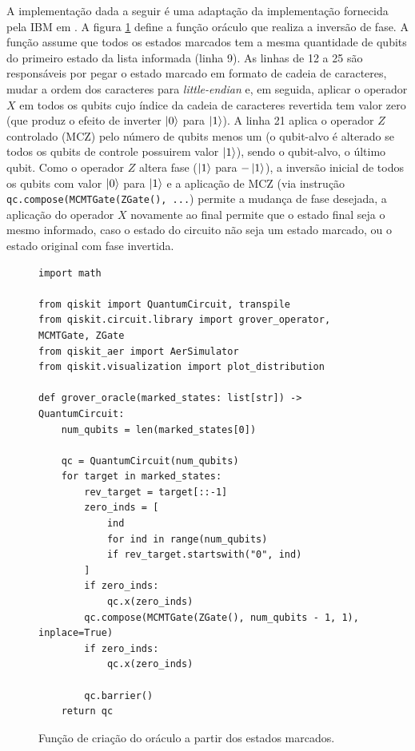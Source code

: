 A implementação dada a seguir é uma adaptação da implementação fornecida pela IBM em \cite{ibm_grover_tutorial}. A figura \ref{fig:qoracle} define a função oráculo que realiza a inversão de fase. A função assume que todos os estados marcados tem a mesma quantidade de qubits do primeiro estado da lista informada (linha 9). As linhas de 12 a 25 são responsáveis por pegar o estado marcado em formato de cadeia de caracteres, mudar a ordem dos caracteres para \textit{little-endian} e, em seguida, aplicar o operador $X$ em todos os qubits cujo índice da cadeia de caracteres revertida tem valor zero (que produz o efeito de inverter $\ket{0}$ para $\ket{1}$). A linha 21 aplica o operador $Z$ controlado (\textsf{MCZ}) pelo número de qubits menos um (o qubit-alvo é alterado se todos os qubits de controle possuirem valor $\ket{1}$), sendo o qubit-alvo, o último qubit. Como o operador $Z$ altera fase ($\ket{1}$ para $-\ket{1}$), a inversão inicial de todos os qubits com valor $\ket{0}$ para $\ket{1}$ e a aplicação de \textsf{MCZ} (via instrução \texttt{qc.compose(MCMTGate(ZGate(), ...}) permite a mudança de fase desejada, a aplicação do operador $X$ novamente ao final permite que o estado final seja o mesmo informado, caso o estado do circuito não seja um estado marcado, ou o estado original com fase invertida.

\begin{figure}[!ht]
\centering
\begin{minipage}{1\textwidth}
\begin{lstlisting}[style=pythonstyle]
import math
 
from qiskit import QuantumCircuit, transpile
from qiskit.circuit.library import grover_operator, MCMTGate, ZGate
from qiskit_aer import AerSimulator
from qiskit.visualization import plot_distribution
 
def grover_oracle(marked_states: list[str]) -> QuantumCircuit: 
    num_qubits = len(marked_states[0])
 
    qc = QuantumCircuit(num_qubits)
    for target in marked_states:
        rev_target = target[::-1]
        zero_inds = [
            ind
            for ind in range(num_qubits)
            if rev_target.startswith("0", ind)
        ]
        if zero_inds:
            qc.x(zero_inds)
        qc.compose(MCMTGate(ZGate(), num_qubits - 1, 1), inplace=True)
        if zero_inds:
            qc.x(zero_inds)

        qc.barrier()
    return qc
\end{lstlisting}
\end{minipage}
\caption{Função de criação do oráculo a partir dos estados marcados.}
\label{fig:qoracle}
\end{figure}

